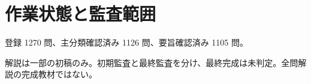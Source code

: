 \chapter{作業状態と監査範囲}
登録 1270 問、主分類確認済み 1126 問、要旨確認済み 1105 問。
\par 解説は一部の初稿のみ。初期監査と最終監査を分け、最終完成は未判定。全問解説の完成教材ではない。
